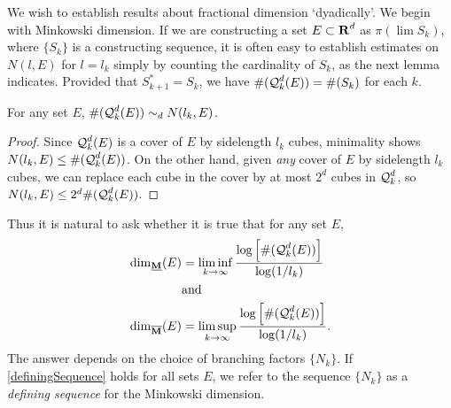 We wish to establish results about fractional dimension `dyadically'. We begin with Minkowski dimension. If we are constructing a set $E \subset \operatorname{\mathbf{R}}^d$ as $\pi \left( \lim S_k \right)$, where $\{ S_k \}$ is a constructing sequence, it is often easy to establish estimates on $N(l,E)$ for $l = l_k$ simply by counting the cardinality of $S_k$, as the next lemma indicates. Provided that $S_{k+1}^* = S_k$, we have $\#(\operatorname{\mathcal{Q}}_k^d(E)) = \#(S_k)$ for each $k$.

\begin{lemma} \label{comparableCovers}
	For any set $E$, $\#(\operatorname{\mathcal{Q}}_k^d(E)) \sim_d N(l_k,E)$.
\end{lemma}
\begin{proof}
	Since $\operatorname{\mathcal{Q}}_k^d(E)$ is a cover of $E$ by sidelength $l_k$ cubes, minimality shows $N(l_k,E) \leq \#(\operatorname{\mathcal{Q}}_k^d(E))$. On the other hand, given \emph{any} cover of $E$ by sidelength $l_k$ cubes, we can replace each cube in the cover by at most $2^d$ cubes in $\operatorname{\mathcal{Q}}_k^d$, so $N(l_k,E) \leq 2^d \#(\operatorname{\mathcal{Q}}_k^d(E))$.
\end{proof}

Thus it is natural to ask whether it is true that for any set $E$,
%
\begin{equation} \label{definingSequence}
	\begin{aligned}
		\operatorname{\dim_{\underline{\mathbf{M}}}}(E) &= \liminf_{k \to \infty} \frac{\log \left[ \#(\operatorname{\mathcal{Q}}_k^d(E)) \right]}{\log(1/l_k)}\\
		&\text{and}\\
		\operatorname{\dim_{\overline{\mathbf{M}}}}(E) &= \limsup_{k \to \infty} \frac{\log \left[ \#(\operatorname{\mathcal{Q}}_k^d(E)) \right]}{\log(1/l_k)}.
	\end{aligned}
\end{equation}
%
The answer depends on the choice of branching factors $\{ N_k \}$. If \eqref{definingSequence} holds for all sets $E$, we refer to the sequence $\{ N_k \}$ as a \emph{defining sequence} for the Minkowski dimension.

%
%

